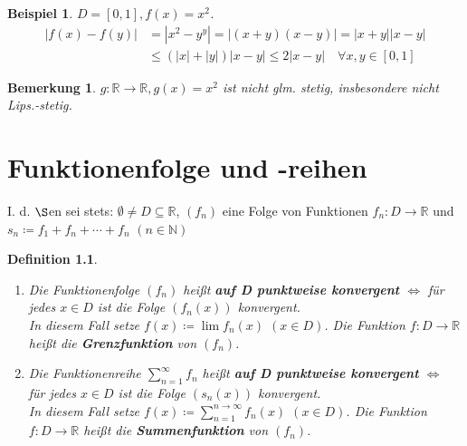 \documentclass{extreport}
\newcommand{\N}{\mathbb{N}}
\newcommand{\R}{\mathbb{R}}
\theoremstyle{named}
\theoremstyle{dotless}
\newtheorem*{beispiel*}{Beispiel}
\newtheorem*{bemerkung}{Bemerkung}
\newtheorem*{definition}{Definition}
\begin{document}
\begin{beispiel*}
	$D = [0, 1], f(x) = x^{2}$.
	\begin{align*}
		|f(x) - f(y) | & = |x^{2} - y^{y}| = |(x + y) (x - y)| = |x+y| |x-y| \\
			& \leq (|x| + |y|) |x - y| \leq 2 |x - y| \quad \forall x, y \in [0, 1]
	\end{align*}
\end{beispiel*}


\begin{bemerkung}
	$g \colon \R \rightarrow \R, g(x) = x^{2}$ ist nicht glm. stetig, insbesondere nicht Lips.-stetig.	
\end{bemerkung}

\newpage

\chapter{Funktionenfolge und -reihen}
I. d. $\S$en sei stets: $\emptyset \neq D \subseteq \R$, $(f_{n})$ eine Folge von Funktionen $f_{n} \colon D \rightarrow \R$ und $s_{n} \coloneqq f_{1} + f_{n} + \cdots + f_{n}$ $(n \in \N)$

  
\begin{definition} ~\
 	\begin{enumerate}
		\item Die Funktionenfolge $(f_{n})$ hei{\ss}t \textbf{auf D punktweise konvergent} $\iff$ für jedes $x \in D$ ist die Folge $(f_{n}(x))$ konvergent. \\
			In diesem Fall setze $f(x) \coloneqq \lim f_{n}(x)$ $(x \in D)$. Die Funktion $f \colon D \rightarrow \R$ hei{\ss}t die \textbf{Grenzfunktion} von $(f_{n})$.
		\item Die Funktionenreihe $\sum_{n=1}^{\infty} f_{n}$ hei{\ss}t  \textbf{auf D punktweise konvergent} $\iff$ für jedes $x \in D$ ist die Folge $(s_{n}(x))$ konvergent. \\
			In diesem Fall setze $f(x) \coloneqq \sum_{n=1}^{n\rightarrow\infty} f_{n}(x)$ $(x \in D)$. Die Funktion $f \colon D \rightarrow \R$ hei{\ss}t die \textbf{Summenfunktion} von $(f_{n})$.
	\end{enumerate}
\end{definition}
\end{document}

